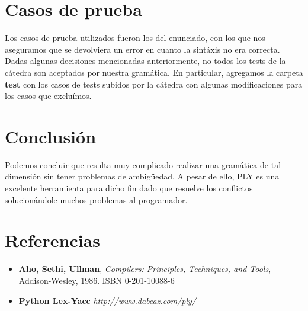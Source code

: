 \documentclass[10pt,a4paper]{article}
\begin{document}
\section{Casos de prueba}
Los casos de prueba utilizados fueron los del enunciado, con los que nos aseguramos que se devolviera un error en cuanto la sintáxis no era correcta. Dadas algunas decisiones mencionadas anteriormente, no todos los tests de la cátedra son aceptados por nuestra gramática. En particular, agregamos la carpeta \textbf{test} con los casos de tests subidos por la cátedra con algunas modificaciones para los casos que excluímos.

\section{Conclusión}
Podemos concluir que resulta muy complicado realizar una gramática de tal dimensión sin tener problemas de ambigüedad. A pesar de ello, PLY es una excelente herramienta para dicho fin dado que resuelve los conflictos solucionándole muchos problemas al programador.

\section{Referencias}
\begin{itemize}
\item \textbf{Aho, Sethi, Ullman}, \textit{Compilers: Principles, Techniques, and Tools}, Addison-Wesley, 1986. ISBN 0-201-10088-6

\item \textbf{Python Lex-Yacc} \textit{http://www.dabeaz.com/ply/}
\end{itemize}
\end{document}
